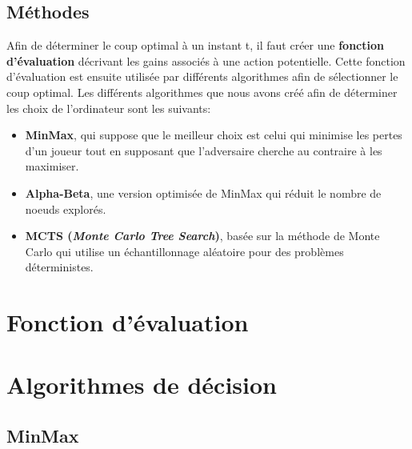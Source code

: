 \documentclass{article}
\begin{document}
\subsection{Méthodes} 
Afin de déterminer le coup optimal à un instant t, il faut créer une \textbf{fonction d'évaluation} décrivant les gains associés à une action potentielle. Cette fonction d'évaluation est ensuite utilisée par différents algorithmes afin de sélectionner le coup optimal. Les différents algorithmes que nous avons créé afin de déterminer les choix de l'ordinateur sont les suivants:\\


\begin{itemize}
   \item \textbf{MinMax}, qui suppose que le meilleur choix est celui qui minimise les pertes d'un joueur tout en supposant que l'adversaire cherche au contraire à les maximiser.\\
   
   \item \textbf{Alpha-Beta}, une version optimisée de MinMax qui réduit le nombre de noeuds explorés.\\
   
   \item \textbf{MCTS (\textit{Monte Carlo Tree Search})}, basée sur la méthode de Monte Carlo qui utilise un échantillonnage aléatoire pour des problèmes déterministes.\\
\end{itemize}

\section{Fonction d'évaluation}

\section{Algorithmes de décision}

\subsection{MinMax}
\end{document}
